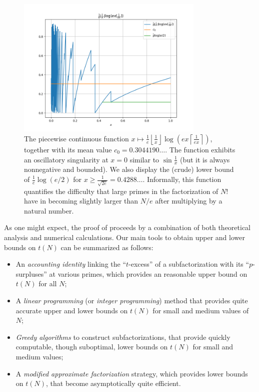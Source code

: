 \documentclass[12pt,a4paper,reqno]{amsart}
\numberwithin{equation}{section}
\theoremstyle{plain}
\theoremstyle{definition}
\begin{document}
\begin{figure}
  \centering
  \includegraphics[width=0.8\textwidth]{integ.png}
  \caption{The piecewise continuous function $x\mapsto \frac{1}{e} \left \lfloor \frac{1}{x} \right\rfloor \log( ex \left \lceil \frac{1}{ex} \right\rceil)$, together with its mean value $c_0 = 0.3044190\dots$.  The function exhibits an oscillatory singularity at $x=0$ similar to $\sin \frac{1}{x}$ (but it is always nonnegative and bounded). We also display the (crude) lower bound of $\frac{1}{e} \log(e/2)$ for $x \geq \frac{1}{\sqrt{2e}} = 0.4288\dots$. Informally, this function quantifies the difficulty that large primes in the factorization of $N!$ have in becoming slightly larger than $N/e$ after multiplying by a natural number.}\label{fig-mean}
\end{figure}

As one might expect, the proof of  proceeds by a combination of both theoretical analysis and numerical calculations.  Our main tools to obtain upper and lower bounds on $t(N)$ can be summarized as follows:

\begin{itemize}
  \item An \emph{accounting identity} linking the ``$t$-excess'' of a subfactorization with its ``$p$-surpluses'' at various primes, which provides an reasonable upper bound on $t(N)$ for all $N$;
  \item A \emph{linear programming} (or \emph{integer programming}) method that provides quite accurate upper and lower bounds on $t(N)$ for small and medium values of $N$;
  \item \emph{Greedy algorithms} to construct subfactorizations, that provide quickly computable, though suboptimal, lower bounds on $t(N)$ for small and medium values;
  \item A \emph{modified approximate factorization} strategy, which provides lower bounds on $t(N)$, that become asymptotically quite efficient.
\end{itemize}
\end{document}
